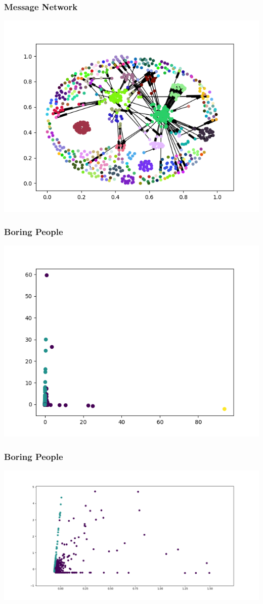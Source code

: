 \documentclass{beamer}
\begin{document}
\begin{frame}\frametitle{Message Network}
\centering
\includegraphics[width=1\textwidth]{messagegraph.png}
\end{frame}
\begin{frame}\frametitle{Boring People}
\centering
\includegraphics[width=1\textwidth]{cluster.png}
\end{frame}
\begin{frame}\frametitle{Boring People}
\centering
\includegraphics[width=1\textwidth]{cluster_zoom.png}
\end{frame}
\end{document}
